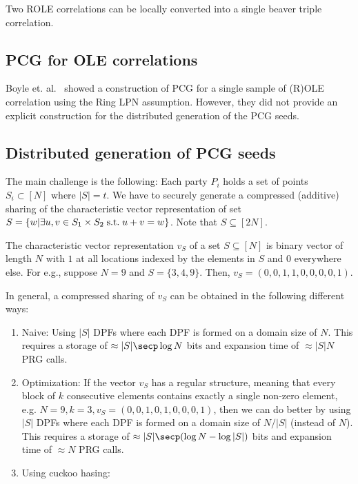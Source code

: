 Two ROLE correlations can be locally converted into a single beaver triple correlation.

\subsection{PCG for OLE correlations}

Boyle et. al.~\cite{boyle2020efficient} showed a construction of PCG for a single sample of (R)OLE correlation using the Ring LPN assumption. However, they did not provide an explicit construction for the distributed generation of the PCG seeds.

\subsection{Distributed generation of PCG seeds}

The main challenge is the following: Each party $P_i$ holds a set of points $S_i \subset [N]$ where $|S| = t$. We have to securely generate a compressed (additive) sharing of the characteristic vector representation of set $S = \{ w | \exists u, v \in S_1 \times S_2 \text{\;s.t.\;} u + v = w \}$. Note that $S \subseteq [2N]$.

The characteristic vector representation $v_S$ of a set $S \subseteq [N]$ is binary vector of length $N$ with $1$ at all locations indexed by the elements in $S$ and $0$ everywhere else. For e.g., suppose $N = 9$ and $S = \{3, 4, 9\}$. Then, $v_S = (0, 0, 1, 1, 0, 0, 0, 0, 1)$.

In general, a compressed sharing of $v_S$ can be obtained in the following different ways:

\begin{enumerate}
  \item Naive: Using $|S|$ DPFs where each DPF is formed on a domain size of $N$. This requires a storage of $\approx |S| \secp \log N$ bits and expansion time of $\approx |S| N$ PRG calls.

  \item Optimization: If the vector $v_S$ has a regular structure, meaning that every block of $k$ consecutive elements contains exactly a single non-zero element, e.g. $N = 9, k = 3, v_S = (0, 0, 1, 0, 1, 0, 0, 0, 1)$, then we can do better by using $|S|$ DPFs where each DPF is formed on a domain size of $N/|S|$ (instead of $N$). This requires a storage of $\approx |S| \secp (\log N - \log |S|)$ bits and expansion time of $\approx N$ PRG calls.

  \item Using cuckoo hasing:
\end{enumerate}

